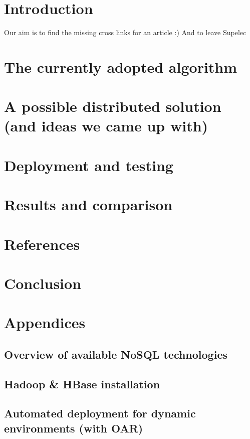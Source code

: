 \usepackage{parskip}



\thispagestyle{empty}

\newpage
\thispagestyle{empty}
\thispagestyle{empty}
\newpage

\listoffigures
\thispagestyle{empty}
\newpage

\listoftables
\thispagestyle{empty}
\newpage

\section{Introduction}
Our aim is to find the missing cross links for an article :) 
And to leave Supelec
\section{The currently adopted algorithm}
\section{A possible distributed solution (and ideas we came up with)}
\section{Deployment and testing}
\section{Results and comparison}

\section{References}
\section{Conclusion}

\section{Appendices}
\subsection{Overview of available NoSQL technologies}
\subsection{Hadoop & HBase installation}
\subsection{Automated deployment for dynamic environments (with OAR)}
